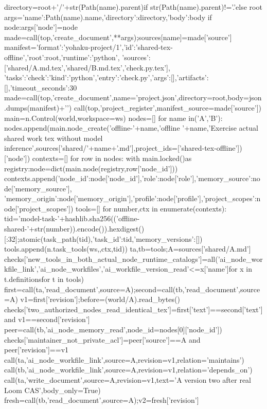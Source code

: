         directory=root+'/'+str(Path(name).parent)if str(Path(name).parent)!='.'else root
        args={'name':Path(name).name,'directory':directory,'body':body}
        if node:args['node']=node
        made=call(top,'create_document',**args);sources[name]=made['source']
    manifest={'format':'yohaku-project/1','id':'shared-tex-offline','root':root,'runtime':'python',
              'sources':['shared/A.md.tex','shared/B.md.tex','check.py.tex'],
              'tasks':{'check':{'kind':'python','entry':'check.py','args':[],'artifacts':[],'timeout_seconds':30}}}
    made=call(top,'create_document',name='project.json',directory=root,body=json.dumps(manifest)+'\n')
    call(top,'project_register',manifest_source=made['source'])
    main=n.Control(world,workspace=ws)
    nodes=[]
    for name in('A','B'):
        nodes.append(main.node_create('offline-'+name,'offline '+name,'Exercise actual shared work tex without model inference',sources['shared/'+name+'.md'],project_ids=['shared-tex-offline'])['node'])
    contexts=[]
    for row in nodes:
        with main.locked()as registry:node=dict(main.node(registry,row['node_id']))
        contexts.append({'node_id':node['node_id'],'role':node['role'],'memory_source':node['memory_source'],
                         'memory_origin':node['memory_origin'],'profile':node['profile'],'project_scopes':node['project_scopes']})
    tools=[]
    for number,ctx in enumerate(contexts):
        tid='model-task-'+hashlib.sha256(('offline-shared-'+str(number)).encode()).hexdigest()[:32];atomic(task_path(tid),{'task_id':tid,'memory_versions':[]})
        tools.append(n.task_tools(ws,{},ctx,tid))
    ta,tb=tools;A=sources['shared/A.md']
    checks['new_tools_in_both_actual_node_runtime_catalogs']=all({'ai_node_workfile_link','ai_node_workfiles','ai_workfile_version_read'}<={x['name']for x in t.definitions}for t in tools)
    first=call(ta,'read_document',source=A);second=call(tb,'read_document',source=A)
    v1=first['revision'];before=(world/A).read_bytes()
    checks['two_authorized_nodes_read_identical_tex']=first['text']==second['text']and v1==second['revision']
    peer=call(tb,'ai_node_memory_read',node_id=nodes[0]['node_id'])
    checks['maintainer_not_private_acl']=peer['source']==A and peer['revision']==v1
    call(ta,'ai_node_workfile_link',source=A,revision=v1,relation='maintains')
    call(tb,'ai_node_workfile_link',source=A,revision=v1,relation='depends_on')
    call(ta,'write_document',source=A,revision=v1,text='A version two after real Loom CAS\n',body_only=True)
    fresh=call(tb,'read_document',source=A);v2=fresh['revision']
